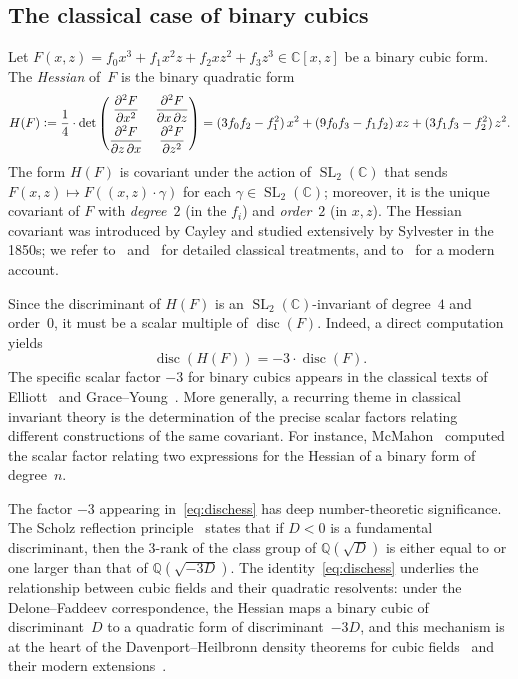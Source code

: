\documentclass[10pt]{amsart}
\theoremstyle{definition}
\theoremstyle{remark}
\DeclareMathOperator{\disc}{disc}
\DeclareMathOperator{\SL}{SL}
\newcommand{\BQ}{\mathbb{Q}}
\newcommand{\BC}{\mathbb{C}}
\newcommand{\defeq}{\vcentcolon=}
\begin{document}
\subsection{The classical case of binary cubics}
Let $F(x,z) = f_0x^3 + f_1x^2z + f_2 x z^2 + f_3 z^3 \in \BC[x,z]$ be a
binary cubic form.  The \emph{Hessian} of~$F$ is the binary quadratic form
\begin{equation}\label{eq:defhess}
H(F) \defeq \frac{1}{4} \cdot \det \begin{pmatrix}
\dfrac{\partial^2 F}{\partial x^2} & \dfrac{\partial^2 F}{\partial x \,\partial z} \\[6pt]
\dfrac{\partial^2 F}{\partial z \,\partial x} & \dfrac{\partial^2 F}{\partial z^2}
\end{pmatrix}
= (3f_0f_2 - f_1^2)\,x^2 + (9f_0f_3 - f_1f_2)\,xz + (3f_1f_3 - f_2^2)\,z^2.
\end{equation}
The form $H(F)$ is covariant under the action of $\SL_2(\BC)$ that sends
$F(x,z) \mapsto F((x,z) \cdot \gamma)$ for each $\gamma \in \SL_2(\BC)$;
moreover, it is the unique covariant of $F$ with \emph{degree}~$2$ (in the $f_i$)
and \emph{order}~$2$ (in $x,z$).  The Hessian covariant was introduced by
Cayley and studied extensively by Sylvester in the 1850s; we refer
to~\cite{Elliott1895} and~\cite{GraceYoung1903} for detailed classical
treatments, and to~\cite{Olver1999} for a modern account.

Since the discriminant of $H(F)$ is an
$\SL_2(\BC)$-invariant of degree~$4$ and order~$0$, it must be a scalar
multiple of $\disc(F)$.  Indeed, a direct computation yields
\begin{equation}\label{eq:dischess}
\disc(H(F)) = -3 \cdot \disc(F).
\end{equation}
The specific scalar factor $-3$ for binary cubics appears in the classical
texts of Elliott~\cite{Elliott1895} and Grace--Young~\cite{GraceYoung1903}.
More generally, a recurring theme in classical invariant theory is the
determination of the precise scalar factors relating different
constructions of the same covariant.  For instance,
McMahon~\cite{McMahon1889} computed the scalar factor relating two
expressions for the Hessian of a binary form of degree~$n$.

The factor $-3$ appearing in~\eqref{eq:dischess} has deep number-theoretic
significance.  The Scholz reflection principle~\cite{Scholz1932} states that
if $D<0$ is a fundamental discriminant, then the $3$-rank of the class group
of $\BQ(\sqrt{D})$ is either equal to or one larger than that of
$\BQ(\sqrt{-3D})$.  The identity~\eqref{eq:dischess} underlies the
relationship between cubic fields and their quadratic resolvents: under
the Delone--Faddeev correspondence, the Hessian maps a binary cubic of
discriminant~$D$ to a quadratic form of discriminant~$-3D$, and this
mechanism is at the heart of the Davenport--Heilbronn density theorems
for cubic fields~\cite{DavenportHeilbronn1971} and their modern
extensions~\cite{Bhargava2004b,BhargavaShankarTsimerman2013,BhargavaVarma2016}.
\end{document}
